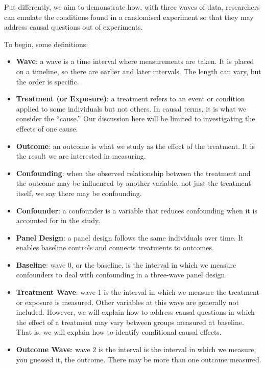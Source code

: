 \documentclass[
  singlecolumn]{article}
\begin{document}
Put differently, we aim to demonstrate how, with three waves of data,
researchers can emulate the conditions found in a randomised experiment
so that they may address causal questions out of experiments.

To begin, some definitions:

\begin{itemize}
\item
  \textbf{Wave}: a wave is a time interval where measurements are taken.
  It is placed on a timeline, so there are earlier and later intervals.
  The length can vary, but the order is specific.
\item
  \textbf{Treatment (or Exposure)}: a treatment refers to an event or
  condition applied to some individuals but not others. In causal terms,
  it is what we consider the ``cause.'' Our discussion here will be
  limited to investigating the effects of one cause.
\item
  \textbf{Outcome}: an outcome is what we study as the effect of the
  treatment. It is the result we are interested in measuring.
\item
  \textbf{Confounding}: when the observed relationship between the
  treatment and the outcome may be influenced by another variable, not
  just the treatment itself, we say there may be confounding.
\item
  \textbf{Confounder}: a confounder is a variable that reduces
  confounding when it is accounted for in the study.
\item
  \textbf{Panel Design}: a panel design follows the same individuals
  over time. It enables baseline controls and connects treatments to
  outcomes.
\item
  \textbf{Baseline}: wave 0, or the baseline, is the interval in which
  we measure confounders to deal with confounding in a three-wave panel
  design.
\item
  \textbf{Treatment Wave}: wave 1 is the interval in which we measure
  the treatment or exposure is measured. Other variables at this wave
  are generally not included. However, we will explain how to address
  causal questions in which the effect of a treatment may vary between
  groups measured at baseline. That is, we will explain how to identify
  conditional causal effects.
\item
  \textbf{Outcome Wave}: wave 2 is the interval is the interval in which
  we measure, you guessed it, the outcome. There may be more than one
  outcome measured.
\end{itemize}
\end{document}
